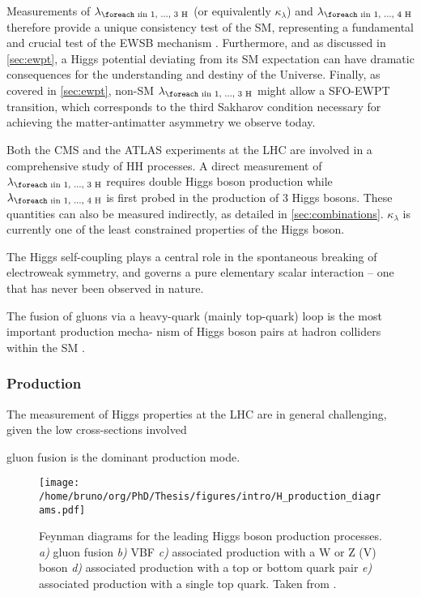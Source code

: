 \documentclass[11pt]{article}
\newcommand{\repeatn}[2]{\foreach \i in {1, ..., #1} {#2}}
\newcommand{\kl}{\kappa_{\lambda}}
\newcommand{\lh}[1]{\lambda_{\text{\repeatn{#1}{H}}}}
\begin{document}
Measurements of \(\lh{3}\) (or equivalently \(\kl\)) and \(\lh{4}\) therefore provide a unique consistency test of the \ac{SM}, representing a fundamental and crucial test of the \ac{EWSB} mechanism \cite{deFlorian:2227475}.
Furthermore, and as discussed in \cref{sec:ewpt}, a Higgs potential deviating from its SM expectation can have dramatic consequences for the understanding and destiny of the Universe.
Finally, as covered in \cref{sec:ewpt}, non-SM \(\lh{3}\) might allow a \ac{SFO-EWPT} transition, which corresponds to the third Sakharov condition necessary for achieving the matter-antimatter asymmetry we observe today.

Both the \ac{CMS} and the \ac{ATLAS} experiments at the \ac{LHC} are involved in a comprehensive study of HH processes.
A direct measurement of \(\lh{3}\) requires double Higgs boson production while \(\lh{4}\) is first probed in the production of 3 Higgs bosons.
These quantities can also be measured indirectly, as detailed in \cref{sec:combinations}.
\(\kl\) is currently one of the least constrained properties of the Higgs boson.


The Higgs self-coupling plays a central role in the spontaneous breaking of electroweak symmetry, and governs a pure elementary scalar interaction – one that has never been observed in nature.

The fusion of gluons via a heavy-quark (mainly top-quark) loop is the most important production mecha-
nism of Higgs boson pairs at hadron colliders within the SM \cite{hllhc_physics}.

\subsubsection{Production}
\label{sec:orgebdcf3b}
\label{sec:production}

The measurement of Higgs properties at the LHC are in general challenging, given the low cross-sections involved

gluon fusion is the dominant production mode.

\begin{figure}[htbp]
\centering
\texttt{[image: /home/bruno/org/PhD/Thesis/figures/intro/H\_production\_diagrams.pdf]}
\caption{\label{fig:H_production_diagrams}Feynman diagrams for the leading Higgs boson production processes. \emph{a)} gluon fusion \emph{b)} \ac{VBF} \emph{c)} associated production with a W or Z (V) boson \emph{d)} associated production with a top or bottom quark pair \emph{e)} associated production with a single top quark. Taken from \cite{higgs_10_years}.}
\end{figure}
\end{document}
